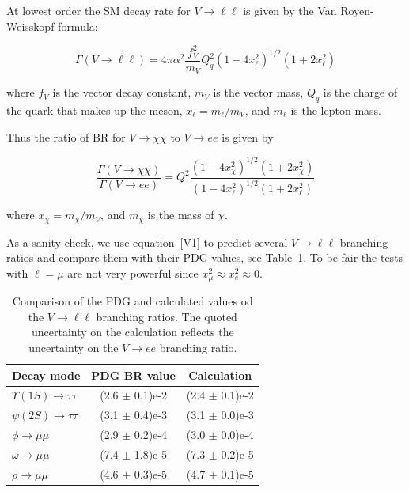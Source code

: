 \documentclass[12pt]{article}
\begin{document}
  At lowest order the SM decay rate for $V \to \ell \ell$ is given
  by the Van Royen-Weisskopf formula\cite{VR1,VR2}:

  \begin{equation}
    \Gamma(V \to \ell \ell) = 4 \pi \alpha^2 \frac{f_V^2}{m_V} Q_q^2
    (1-4x_\ell^2)^{1/2} (1+2x_\ell^2)
    \end{equation}

  \noindent where $f_V$ is the vector decay constant, $m_V$ is the
  vector mass, $Q_q$ is the charge of the quark that makes up the meson,
  $x_\ell = m_\ell/m_V$, and $m_\ell$ is the lepton mass.

  \noindent Thus the ratio of BR for $V \to \chi \chi$ to $V \to ee$ is
  given by

  \begin{equation} 
    \frac{\Gamma(V \to \chi \chi)}{\Gamma(V \to ee)} = Q^2
    \frac{(1-4x_\chi^2)^{1/2} (1+2x_\chi^2)}{(1-4x_\ell^2)^{1/2} (1+2x_\ell^2)}
    \label{V1}
    \end{equation}

  \noindent where $x_\chi = m_\chi/m_V$, and $m_\chi$ is the mass of $\chi$.
  
  As a sanity check, we use equation~\ref{V1} to predict several $V \to \ell \ell$
  branching ratios and compare them with their PDG values, see Table~\ref{tab:VBR}.
  To be fair the tests with $\ell = \mu$ are not very powerful since
  $x_{\mu}^2 \approx x_{e}^2 \approx 0$.

  \begin{table}
    \begin{center}
      \begin{tabular}{|l|c|c|}
        \hline
        Decay mode & PDG BR value & Calculation \\
        \hline
        $\Upsilon(1S) \to \tau \tau$  & (2.6 $\pm$ 0.1)e-2 & (2.4 $\pm$ 0.1)e-2 \\
        $\psi(2S) \to \tau \tau$  & (3.1 $\pm$ 0.4)e-3 & (3.1 $\pm$ 0.0)e-3 \\
        $\phi \to \mu \mu$       & (2.9 $\pm$ 0.2)e-4  & (3.0 $\pm$ 0.0)e-4 \\  
        $\omega \to \mu \mu$ & (7.4 $\pm$ 1.8)e-5  & (7.3 $\pm$ 0.2)e-5 \\  
        $\rho \to \mu \mu$      & (4.6 $\pm$ 0.3)e-5  &  (4.7 $\pm$ 0.1)e-5 \\  
        \hline
      \end{tabular}
      \caption{Comparison of the PDG and calculated values od the $V \to \ell \ell$
        branching ratios.  The quoted uncertainty on the calculation reflects the uncertainty
        on the $V \to ee$ branching ratio.}
      \label{tab:VBR}
    \end{center}
  \end{table}
\end{document}
